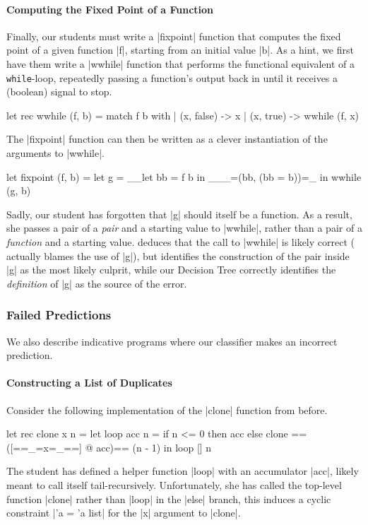 \paragraph{Computing the Fixed Point of a Function}
Finally, our students must write a |fixpoint| function that computes the
fixed point of a given function |f|, starting from an initial value |b|.
%
As a hint, we first have them write a |wwhile| function that performs the
functional equivalent of a \texttt{while}-loop, repeatedly passing a function's
output back in until it receives a (boolean) signal to stop.
%
\begin{ecode}
  let rec wwhile (f, b) =
    match f b with
    | (x, false) -> x
    | (x, true)  -> wwhile (f, x)
\end{ecode}
\lstset{firstnumber=last}
%
The |fixpoint| function can then be written as a clever instantiation of
the arguments to |wwhile|.
%
\begin{ecode}
  let fixpoint (f, b) =
    let g = __let bb = f b in ___=(bb, (bb = b))=_ in
    wwhile (g, b)
\end{ecode}
\lstset{firstnumber=1}
%
Sadly, our student has forgotten that |g| should itself be a function.
%
As a result, she passes a pair of a \emph{pair} and a starting value to
|wwhile|, rather than a pair of a \emph{function} and a starting value.
%
\sherrloc deduces that the call to |wwhile| is likely correct (\ocaml
actually blames the use of |g|), but identifies the construction of the
pair inside |g| as the most likely culprit, while our Decision Tree
correctly identifies the \emph{definition} of |g| as the source of the
error.


\subsubsection{Failed Predictions}
\label{sec:failed-predictions}
We also describe indicative programs where our classifier makes an
incorrect prediction.

\paragraph{Constructing a List of Duplicates}
Consider the following implementation of the |clone| function from
before.
%
\begin{ecode}
  let rec clone x n =
    let loop acc n =
      if n <= 0 then
        acc
      else
        clone ==([==_=x=_==] @ acc)== (n - 1) in
    loop [] n
\end{ecode}
%
The student has defined a helper function |loop| with an accumulator
|acc|, likely meant to call itself tail-recursively.
%
Unfortunately, she has called the top-level function |clone| rather than
|loop| in the |else| branch, this induces a cyclic constraint |'a = 'a list|
for the |x| argument to |clone|.

